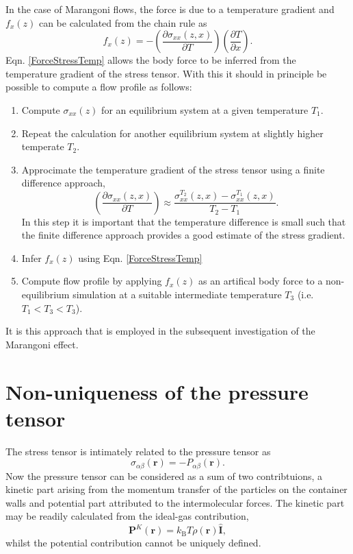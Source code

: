 In the case of Marangoni flows, the force is due to a temperature gradient and $f_{x}(z)$ can be calculated from the chain rule as
\begin{equation}
\label{ForceStressTemp}
f_{x}(z) = - \left( \frac{\partial \sigma_{xx}(z,x)}{\partial T} \right) \left( \frac{\partial T}{\partial x} \right).
\end{equation}
Eqn. \ref{ForceStressTemp} allows the body force to be inferred from the temperature gradient of the stress tensor.
With this it should in principle be possible to compute a flow profile as follows:
\begin{enumerate}
	\item Compute $\sigma_{xx}(z)$ for an equilibrium system at a given temperature $T_{1}$.
	\item Repeat the calculation for another equilibrium system at slightly higher temperate $T_{2}$.
	\item Approcimate the temperature gradient of the stress tensor using a finite difference approach,
		$$\left( \frac{\partial \sigma_{xx}(z,x)}{\partial T} \right) \approx \frac{\sigma_{xx}^{T_{2}}(z,x) - \sigma_{xx}^{T_{1}}(z,x)}{T_{2} - T_{1}}.$$
	      In this step it is important that the temperature difference is small such that the finite difference approach provides a good estimate of the stress gradient.
	\item Infer $f_{x}(z)$ using Eqn. \ref{ForceStressTemp}
	\item Compute flow profile by applying $f_{x}(z)$ as an artifical body force to a non-equilibrium simulation at a suitable intermediate temperature $T_{3}$ (i.e. $T_{1} < T_{3} < T_{3}$).
\end{enumerate}

It is this approach that is employed in the subsequent investigation of the Marangoni effect. 

\section{Non-uniqueness of the pressure tensor}
The stress tensor is intimately related to the pressure tensor as
\begin{equation}
\sigma_{\alpha \beta}(\mathbf{r}) = - P_{\alpha \beta} (\mathbf{r}).
\end{equation}
Now the pressure tensor can be considered as a sum of two contribtuions, a kinetic part arising from the momentum transfer of the particles on the container walls and potential part attributed to the intermolecular forces.\cite{VarnikBinder}
The kinetic part may be readily calculated from the ideal-gas contribution,
\begin{equation}
\mathbf{P}^{K}(\mathbf{r})=k_{\mathrm{B}} T \rho(\mathbf{r}) \hat{\mathbf{I}},
\end{equation}
whilst the potential contribution cannot be uniquely defined.

